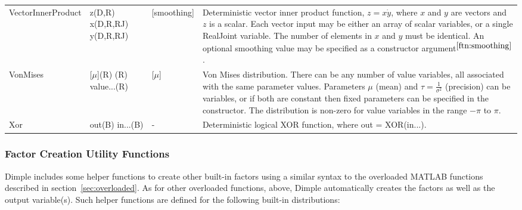 \begin{longtable} {p{3.5cm} p{2.2cm} p{2cm} p{7cm}}
%
VectorInnerProduct & z(D,R) \newline x(D,R,RJ) \newline y(D,R,RJ) & [smoothing] & Deterministic vector inner product function, $z = x \dot y$, where $x$ and $y$ are vectors and $z$ is a scalar. Each vector input may be either an array of scalar variables, or a single RealJoint variable. The number of elements in $x$ and $y$ must be identical. An optional smoothing value may be specified as a constructor argument$^{\ref{ftn:smoothing}}$. \\
%
VonMises & [$\mu$](R) \newline [$\tau$](R) \newline value...(R) & [$\mu$] \newline [$\tau$] & Von Mises distribution. There can be any number of value variables, all associated with the same parameter values.  Parameters $\mu$ (mean) and $\tau = \frac{1}{\sigma^{2}}$ (precision) can be variables, or if both are constant then fixed parameters can be specified in the constructor.  The distribution is non-zero for value variables in the range $-\pi$ to $\pi$. \\
%
Xor & out(B) \newline in...(B) & - & Deterministic logical XOR function, where out = XOR(in...). \\
%
\end{longtable}



\ifmatlab
\subsubsection{Factor Creation Utility Functions}

Dimple includes some helper functions to create other built-in factors using a similar syntax to the overloaded MATLAB functions described in section~\ref{sec:overloaded}.  As for other overloaded functions, above, Dimple automatically creates the factors as well as the output variable(s).  Such helper functions are defined for the following built-in distributions:

